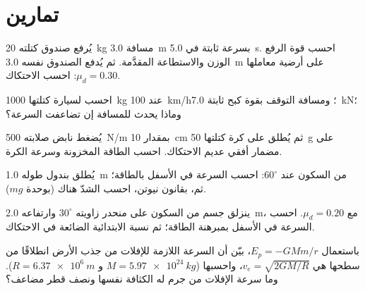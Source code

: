\section{تمارين}

\begin{exercise}[$\star$]\label{exo:b1:work-and-energy:1}
يُرفع صندوق كتلته \qty{20}{kg} مسافة \qty{3.0}{m} بسرعة ثابتة في
\qty{5.0}{s}. احسب  قوة الرفع  الوزن والاستطاعة
المقدَّمة. ثم يُدفع الصندوق نفسه \qty{3.0}{m} على أرضية معاملها
$\mu_d = 0.30$: احسب  الاحتكاك.
\end{exercise}

\begin{exercise}[$\star$]\label{exo:b1:work-and-energy:2}
احسب  لسيارة كتلتها \qty{1000}{kg} عند \qty{100}{km/h}؛ ومسافة
التوقف بقوة كبح ثابتة \qty{7.0}{kN}؛ وماذا يحدث للمسافة إن
تضاعفت السرعة؟
\end{exercise}

\begin{exercise}[$\star$]\label{exo:b1:work-and-energy:3}
يُضغط نابض صلابته \qty{500}{N/m} بمقدار \qty{10}{cm} ثم يُطلق على
كرة كتلتها \qty{50}{g} على مضمار أفقي عديم الاحتكاك.
احسب الطاقة المخزونة وسرعة الكرة.
\end{exercise}

\begin{exercise}[$\star$]\label{exo:b1:work-and-energy:4}
يُطلق بندول طوله \qty{1.0}{m} من السكون عند $60^\circ$:
احسب السرعة في الأسفل بالطاقة؛ ثم، بقانون نيوتن، احسب الشدّ
هناك (بوحدة $mg$).
\end{exercise}

\begin{exercise}[$\star\star$]\label{exo:b1:work-and-energy:5}
ينزلق جسم من السكون على منحدر زاويته $30^\circ$ وارتفاعه \qty{2.0}{m}،
مع $\mu_d = 0.20$. احسب السرعة في الأسفل بمبرهنة الطاقة؛ ثم نسبة
 الابتدائية الضائعة في الاحتكاك.
\end{exercise}

\begin{exercise}[$\star\star$]\label{exo:b1:work-and-energy:6}
باستعمال $E_p = -GMm/r$، بيّن أن السرعة اللازمة للإفلات من جذب
الأرض انطلاقًا من سطحها هي $v_e = \sqrt{2GM/R}$، واحسبها
($M = \qty{5.97e24}{kg}$ و $R = \qty{6.37e6}{m}$). وما سرعة الإفلات
من جرم له الكثافة نفسها ونصف قطر مضاعف؟
\end{exercise}

